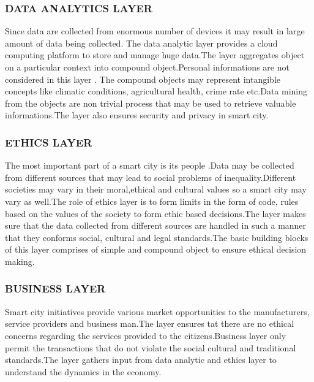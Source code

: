 \documentclass[10pt,a4paper,journal]{IEEEtran}
\begin{document}
\subsubsection{DATA ANALYTICS LAYER}
Since data are collected from enormous number of devices it may result in large amount of data being collected. The data analytic layer provides a cloud computing platform to store and manage huge data.The layer aggregates object on a particular context into compound object.Personal informations are not considered in this layer . The compound objects may represent intangible concepts like  climatic conditions, agricultural health, crime rate etc.Data mining from the objects are non trivial process that may be used to retrieve valuable informations.The layer also ensures security and privacy\cite{6} in smart city.
\\
\subsubsection{ETHICS LAYER}
The most important part of a smart city is its people .Data may be collected from different sources that may lead to social problems of inequality.Different societies may vary in their moral,ethical and cultural values so a smart city may vary as well.The role of ethics layer is to form limits in the form of code, rules based on the  values of the society to form ethic based decisions.The layer makes sure that the data collected from different sources are handled in such a manner that they 
conforms social, cultural and legal standards.The basic building blocks of this layer comprises of simple and compound object to ensure ethical decision making.
\\
\subsubsection{BUSINESS LAYER}
Smart city initiatives provide various market opportunities to the manufacturers, service providers and business man.The layer ensures tat there are no ethical concerns regarding the services provided to the citizens.Business layer only permit the transactions that do not violate the social cultural and traditional standards.The layer gathers input from data analytic and ethics layer to understand the dynamics in the economy.
\\
\end{document}
